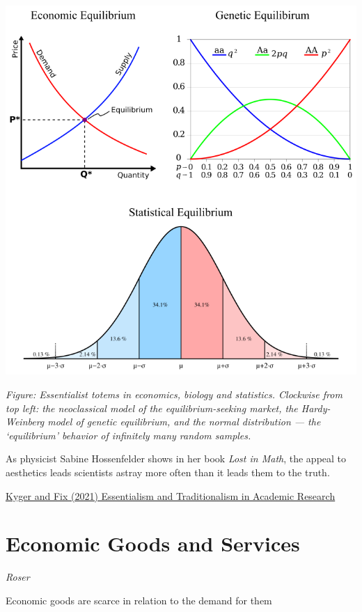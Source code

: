 \documentclass[
]{book}
\begin{document}
\includegraphics{fig/essentialist_totems.png}

\emph{Figure: Essentialist totems in economics, biology and statistics. Clockwise from top left: the neoclassical model of the equilibrium-seeking market, the Hardy-Weinberg model of genetic equilibrium, and the normal distribution --- the `equilibrium' behavior of infinitely many random samples.}

As physicist Sabine Hossenfelder shows in her book \emph{Lost in Math}, the appeal to aesthetics leads scientists astray more often than it leads them to the truth.

\href{https://economicsfromthetopdown.com/2021/07/02/essentialism-and-traditionalism-in-academic-research/}{Kyger and Fix (2021) Essentialism and Traditionalism in Academic Research}

\hypertarget{economic-goods-and-services}{%
\section{Economic Goods and Services}\label{economic-goods-and-services}}

\emph{Roser}

Economic goods are scarce in relation to the demand for them
\end{document}
